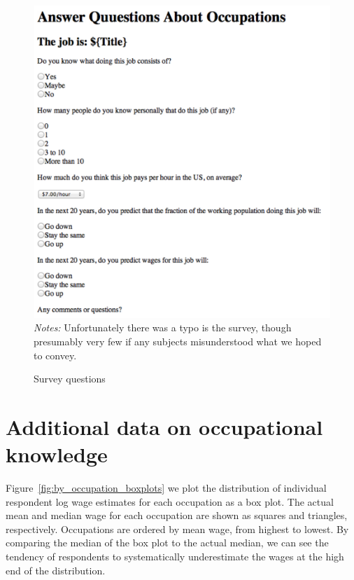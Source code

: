 \documentclass[12pt]{article}
\begin{document}
\begin{figure}
\centering
\caption{Survey questions \label{fig:survey}}
\begin{minipage}{0.75 \linewidth}
\includegraphics[width = \linewidth]{./images/survey.png}
\emph{Notes:} Unfortunately there was a typo is the survey, though presumably very few if any subjects misunderstood what we hoped to convey. 
\end{minipage}  
\end{figure} 

\section{Additional data on occupational knowledge} \label{sec:additional}

Figure~\ref{fig:by_occupation_boxplots} we plot the distribution of individual respondent log wage estimates for each occupation as a box plot. 
The actual mean and median wage for each occupation are shown as squares and triangles, respectively. 
Occupations are ordered by mean wage, from highest to lowest. 
By comparing the median of the box plot to the actual median, we can see the tendency of respondents to systematically underestimate the wages at the high end of the distribution. 
\end{document}
